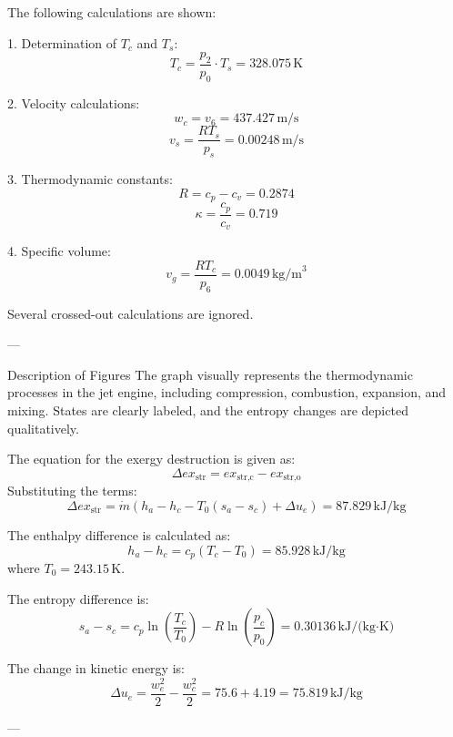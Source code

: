 The following calculations are shown:  

1. Determination of \( T_c \) and \( T_s \):  
\[
T_c = \frac{p_2}{p_0} \cdot T_s = 328.075 \, \text{K}
\]

2. Velocity calculations:  
\[
w_c = v_6 = 437.427 \, \text{m/s}
\]
\[
v_s = \frac{R T_s}{p_s} = 0.00248 \, \text{m/s}
\]

3. Thermodynamic constants:  
\[
R = c_p - c_v = 0.2874
\]
\[
\kappa = \frac{c_p}{c_v} = 0.719
\]

4. Specific volume:  
\[
v_g = \frac{R T_c}{p_6} = 0.0049 \, \text{kg/m}^3
\]  

Several crossed-out calculations are ignored.  

---

Description of Figures  
The graph visually represents the thermodynamic processes in the jet engine, including compression, combustion, expansion, and mixing. States are clearly labeled, and the entropy changes are depicted qualitatively.

The equation for the exergy destruction is given as:  
\[
\Delta ex_{\text{str}} = ex_{\text{str,c}} - ex_{\text{str,o}}
\]  
Substituting the terms:  
\[
\Delta ex_{\text{str}} = \dot{m} \left( h_a - h_c - T_0 (s_a - s_c) + \Delta u_e \right) = 87.829 \, \text{kJ/kg}
\]  

The enthalpy difference is calculated as:  
\[
h_a - h_c = c_p (T_c - T_0) = 85.928 \, \text{kJ/kg}
\]  
where \( T_0 = 243.15 \, \text{K} \).  

The entropy difference is:  
\[
s_a - s_c = c_p \ln \left( \frac{T_c}{T_0} \right) - R \ln \left( \frac{p_c}{p_0} \right) = 0.30136 \, \text{kJ/(kg·K)}
\]  

The change in kinetic energy is:  
\[
\Delta u_e = \frac{w_e^2}{2} - \frac{w_c^2}{2} = 75.6 + 4.19 = 75.819 \, \text{kJ/kg}
\]  

---